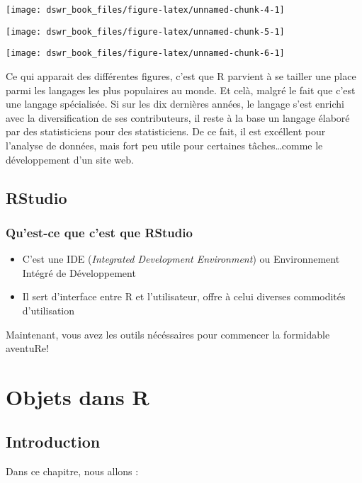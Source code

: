 \documentclass[]{book}
\begin{document}
\texttt{[image: dswr\_book\_files/figure-latex/unnamed-chunk-4-1]}

\texttt{[image: dswr\_book\_files/figure-latex/unnamed-chunk-5-1]}

\texttt{[image: dswr\_book\_files/figure-latex/unnamed-chunk-6-1]}

Ce qui apparait des différentes figures, c'est que R parvient à se
tailler une place parmi les langages les plus populaires au monde. Et
celà, malgré le fait que c'est une langage spécialisée. Si sur les dix
dernières années, le langage s'est enrichi avec la diversification de
ses contributeurs, il reste à la base un langage élaboré par des
statisticiens pour des statisticiens. De ce fait, il est excéllent pour
l'analyse de données, mais fort peu utile pour certaines
tâches\ldots{}comme le développement d'un site web.

\section{RStudio}\label{rstudio}

\subsection{Qu'est-ce que c'est que
RStudio}\label{quest-ce-que-cest-que-rstudio}

\begin{itemize}
\item
  C'est une IDE (\emph{Integrated Development Environment}) ou
  Environnement Intégré de Développement
\item
  Il sert d'interface entre R et l'utilisateur, offre à celui diverses
  commodités d'utilisation
\end{itemize}

Maintenant, vous avez les outils nécéssaires pour commencer la
formidable aventuRe!

\chapter{Objets dans R}\label{objets-dans-r}

\section{Introduction}\label{introduction-1}

Dans ce chapitre, nous allons :
\end{document}
